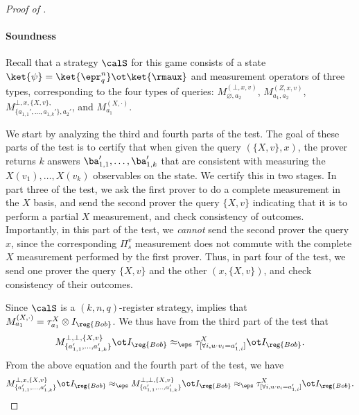 \begin{proof}[Proof of ]
  \paragraph{Soundness}
   Recall that a strategy $\calS$ for this game
  consists of a state $\ket{\psi} = \ket{\epr^n_q} \ot \ket{\rmaux}$ and measurement operators of three types, corresponding to
  the four types of queries: $M^{(\bot,
    x,v)}_{\varnothing, a_2}$, $M^{(Z, x, v)}_{a_1, a_2}$, $M^{\bot, x, \{X, v\}, }_{\{a_{1,1}',
    \dots, a_{1,k}'\}, a_2'}$, and $M^{(X, \cdot)}_{a_1}$. 

  We start by analyzing the third and fourth parts of the test. The goal of these
  parts of the test is to certify that when given the query $(\{X, v\}, x)$, the prover returns $k$ answers $\ba_{1,1}',
  \dots, \ba_{1,k}'$ that are consistent with measuring the $X(v_1),
  \dots, X(v_k)$ observables on the state. We certify this in two
  stages. In part three of the test, we ask
  the first prover to do a complete measurement in the $X$ basis, and send
  the second prover the query $\{X, v\}$ indicating that it is to
  perform a partial $X$ measurement, and
  check consistency of outcomes. Importantly, in this part of the
  test, we \emph{cannot} send the second prover the query $x$, since
  the corresponding $\Pi^v_s$ measurement does not commute with the
  complete $X$ measurement performed by the first prover. Thus, in
  part four of the test, we send one prover the query $\{X, v\}$ and
  the other $(x, \{X, v\})$, and check consistency of their
  outcomes. 
  
  Since $\calS$ is a
  $(k,n,q)$-register strategy,  implies that
  $M_{a_1}^{(X,\cdot)} = \tau^{X}_{a_1} \otimes I_{\reg{Bob}}$. We thus have
  from the third part of the test that
  \[ M^{\bot, \bot, \{X, v\}}_{\{a_{1,1}', \dots,
      a_{1,k}'\}} \ot I_{\reg{Bob}} \approx_\eps \tau^{X}_{[\forall i,
      u \cdot v_i = a'_{1,i}]} \ot I_{\reg{Bob}}.\]
  From the above equation and the fourth part of the test, we have
  \[ M^{\bot, x, \{X, v\}}_{\{a_{1,1}', \dots, a_{1,k}'\}} \ot
    I_{\reg{Bob}} \approx_\eps M^{\bot, \bot, \{X,v\}}_{\{a_{1,1}',
      \dots, a_{1,k}'\}} \ot I_{\reg{Bob}} \approx_\eps \tau^X_{[\forall i, u \cdot v_i =
      a'_{1,i}]} \ot I_{\reg{Bob}}. \]
  

\end{proof}
